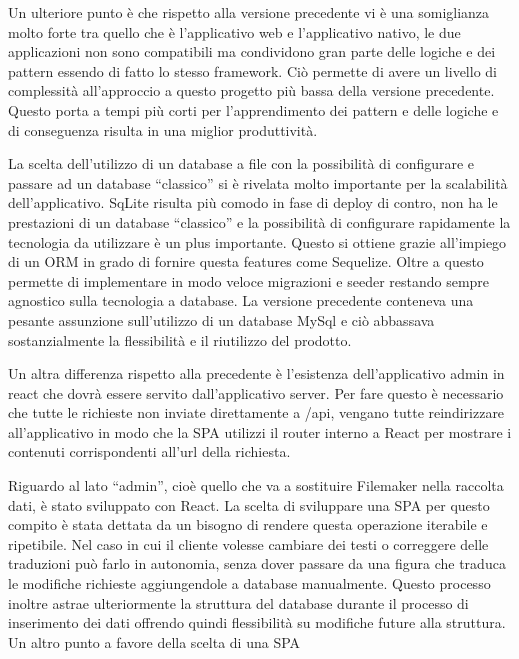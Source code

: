 Un ulteriore punto è che rispetto alla versione precedente vi è una somiglianza molto forte tra quello che è l’applicativo web e l’applicativo nativo, le due applicazioni non sono compatibili ma condividono gran parte delle logiche e dei pattern essendo di fatto lo stesso framework. Ciò permette di avere un livello di complessità all'approccio a questo progetto più bassa della versione precedente. Questo porta a tempi più corti per l'apprendimento dei pattern e delle logiche e di conseguenza risulta in una miglior produttività.\vspace{5mm}
	
La scelta dell’utilizzo di un database a file con la possibilità di configurare e passare ad un database “classico” si è rivelata molto importante per la scalabilità dell’applicativo. SqLite risulta più comodo in fase di deploy di contro, non ha le prestazioni di un database “classico” e la possibilità di configurare rapidamente la tecnologia da utilizzare è un plus importante. Questo si ottiene grazie all’impiego di un ORM in grado di fornire questa features come Sequelize. Oltre a questo permette di implementare in modo veloce migrazioni e seeder restando sempre agnostico sulla tecnologia a database. La versione precedente conteneva una pesante assunzione sull’utilizzo di un database MySql e ciò abbassava sostanzialmente la flessibilità e il riutilizzo del prodotto.\vspace{5mm}

Un altra differenza rispetto alla precedente è l’esistenza dell’applicativo admin in react che dovrà essere servito dall’applicativo server. Per fare questo è necessario che tutte le richieste non inviate direttamente a /api, vengano tutte reindirizzare all’applicativo in modo che la SPA utilizzi il router interno a React per mostrare i contenuti corrispondenti all’url della richiesta.\vspace{5mm}

Riguardo al lato “admin”, cioè quello che va a sostituire Filemaker nella raccolta dati, è stato sviluppato con React. La scelta di sviluppare una SPA\cite{SPA} per questo compito è stata dettata da un bisogno di rendere questa operazione iterabile e ripetibile. Nel caso in cui il cliente volesse cambiare dei testi o correggere delle traduzioni può farlo in autonomia, senza dover passare da una figura che traduca le modifiche richieste aggiungendole a database manualmente. Questo processo inoltre astrae ulteriormente la struttura del database durante il processo di inserimento dei dati offrendo quindi flessibilità su modifiche future alla struttura. Un altro punto a favore della scelta di una SPA \vspace{5mm}

